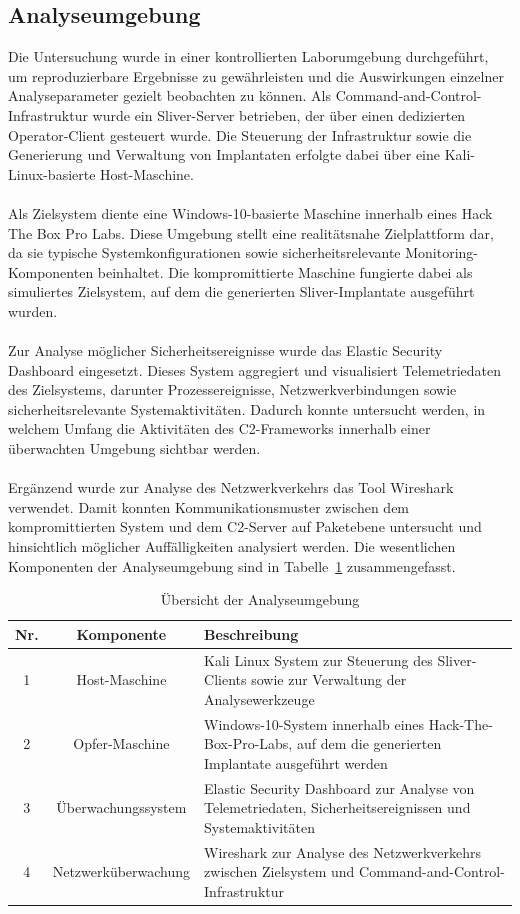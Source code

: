 \subsection{Analyseumgebung}
Die Untersuchung wurde in einer kontrollierten Laborumgebung durchgeführt, um reproduzierbare Ergebnisse zu gewährleisten und die Auswirkungen einzelner Analyseparameter gezielt beobachten zu können. 
Als Command-and-Control-Infrastruktur wurde ein Sliver-Server betrieben, der über einen dedizierten Operator-Client gesteuert wurde. 
Die Steuerung der Infrastruktur sowie die Generierung und Verwaltung von Implantaten erfolgte dabei über eine Kali-Linux-basierte Host-Maschine.
\\\\
Als Zielsystem diente eine Windows-10-basierte Maschine innerhalb eines Hack The Box Pro Labs. 
Diese Umgebung stellt eine realitätsnahe Zielplattform dar, da sie typische Systemkonfigurationen sowie sicherheitsrelevante Monitoring-Komponenten beinhaltet. 
Die kompromittierte Maschine fungierte dabei als simuliertes Zielsystem, auf dem die generierten Sliver-Implantate ausgeführt wurden.
\\\\
Zur Analyse möglicher Sicherheitsereignisse wurde das Elastic Security Dashboard eingesetzt. 
Dieses System aggregiert und visualisiert Telemetriedaten des Zielsystems, darunter Prozessereignisse, Netzwerkverbindungen sowie sicherheitsrelevante Systemaktivitäten. 
Dadurch konnte untersucht werden, in welchem Umfang die Aktivitäten des C2-Frameworks innerhalb einer überwachten Umgebung sichtbar werden.
\\\\
Ergänzend wurde zur Analyse des Netzwerkverkehrs das Tool Wireshark verwendet. 
Damit konnten Kommunikationsmuster zwischen dem kompromittierten System und dem C2-Server auf Paketebene untersucht und hinsichtlich möglicher Auffälligkeiten analysiert werden.
Die wesentlichen Komponenten der Analyseumgebung sind in Tabelle~\ref{tab:analyseumgebung} zusammengefasst.
\begin{table}[H]
\centering
\begin{tabularx}{\textwidth}{|c|c|X|}
\hline
\textbf{Nr.} & \textbf{Komponente} & \textbf{Beschreibung} \\
\hline
1 & Host-Maschine & Kali Linux System zur Steuerung des Sliver-Clients sowie zur Verwaltung der Analysewerkzeuge \\
\hline
2 & Opfer-Maschine & Windows-10-System innerhalb eines Hack-The-Box-Pro-Labs, auf dem die generierten Implantate ausgeführt werden \\
\hline
3 & Überwachungssystem & Elastic Security Dashboard zur Analyse von Telemetriedaten, Sicherheitsereignissen und Systemaktivitäten \\
\hline
4 & Netzwerküberwachung & Wireshark zur Analyse des Netzwerkverkehrs zwischen Zielsystem und Command-and-Control-Infrastruktur \\
\hline
\end{tabularx}
\caption{Übersicht der Analyseumgebung}
\label{tab:analyseumgebung}
\end{table}
